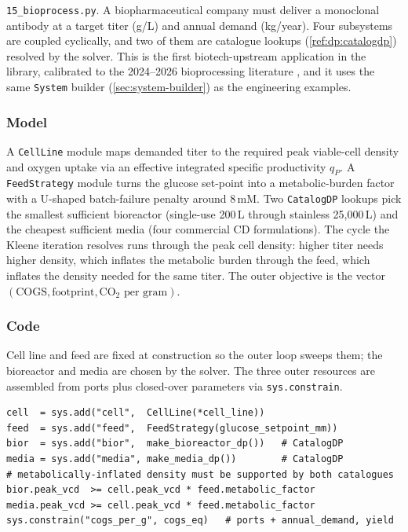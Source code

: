 \documentclass[11pt,a4paper]{article}
\begin{document}
\texttt{15\_bioprocess.py}. A biopharmaceutical company must deliver a
monoclonal antibody at a target titer (g/L) and annual demand
(kg/year). Four subsystems are coupled cyclically, and two of them are
catalogue lookups (\ref{ref:dp:catalogdp}) resolved by the solver. This
is the first biotech-upstream application in the library, calibrated to
the 2024--2026 bioprocessing literature
\citep{yoon2003low,sou2015hypothermia,trummer2006shifting,khattak2010feed,%
gagnon2011hipdog,reinhart2019bioprocessing,lao1997ammonium}, and it uses the same
\texttt{System} builder (\ref{sec:system-builder}) as the engineering
examples.

\subsubsection*{Model}

A \texttt{CellLine} module maps demanded titer to the required peak
viable-cell density and oxygen uptake via an effective integrated
specific productivity $q_P$. A \texttt{FeedStrategy} module turns the
glucose set-point into a metabolic-burden factor with a U-shaped
batch-failure penalty around 8\,mM. Two \texttt{CatalogDP} lookups pick
the smallest sufficient bioreactor (single-use 200\,L through stainless
25{,}000\,L) and the cheapest sufficient media (four commercial CD
formulations). The cycle the Kleene iteration resolves runs through the
peak cell density: higher titer needs higher density, which inflates
the metabolic burden through the feed, which inflates the density
needed for the same titer. The outer objective is the vector
$(\text{COGS}, \text{footprint}, \text{CO}_2\text{ per gram})$.

\subsubsection*{Code}

Cell line and feed are fixed at construction so the outer loop sweeps
them; the bioreactor and media are chosen by the solver. The three
outer resources are assembled from ports plus closed-over parameters
via \texttt{sys.constrain}.

\begin{lstlisting}
cell  = sys.add("cell",  CellLine(*cell_line))
feed  = sys.add("feed",  FeedStrategy(glucose_setpoint_mm))
bior  = sys.add("bior",  make_bioreactor_dp())   # CatalogDP
media = sys.add("media", make_media_dp())        # CatalogDP
# metabolically-inflated density must be supported by both catalogues
bior.peak_vcd  >= cell.peak_vcd * feed.metabolic_factor
media.peak_vcd >= cell.peak_vcd * feed.metabolic_factor
sys.constrain("cogs_per_g", cogs_eq)   # ports + annual_demand, yield
\end{lstlisting}
\end{document}
